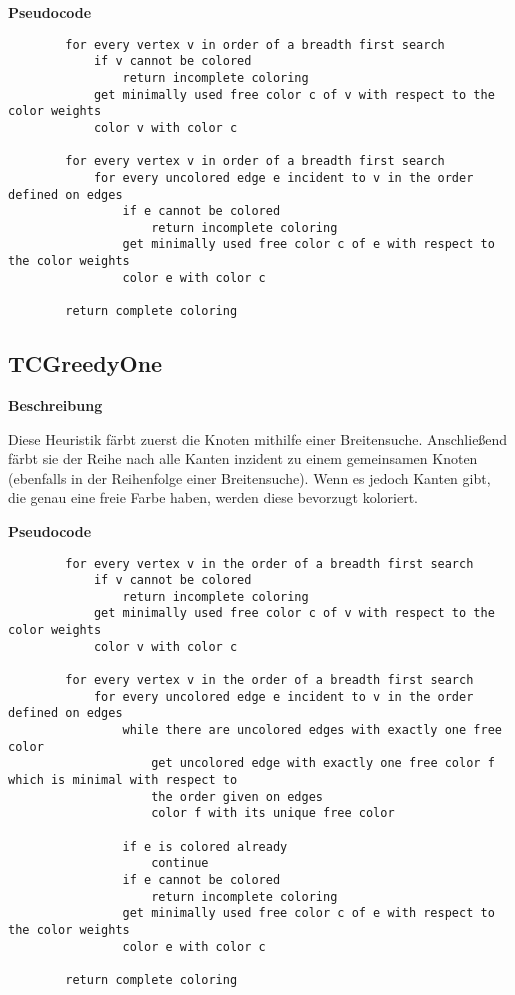 \documentclass{article}
\begin{document}
	\textbf{Pseudocode}
	\begin{verbatim}
		for every vertex v in order of a breadth first search
		    if v cannot be colored
		        return incomplete coloring
		    get minimally used free color c of v with respect to the color weights
		    color v with color c
				    
		for every vertex v in order of a breadth first search
		    for every uncolored edge e incident to v in the order defined on edges
		        if e cannot be colored
		            return incomplete coloring
		        get minimally used free color c of e with respect to the color weights
		        color e with color c
				        
		return complete coloring
	\end{verbatim}
	
	\subsection{TCGreedyOne}
	
	\textbf{Beschreibung}
	
	Diese Heuristik färbt zuerst die Knoten mithilfe einer Breitensuche. Anschließend färbt sie der Reihe nach alle Kanten inzident zu einem gemeinsamen Knoten  (ebenfalls in der Reihenfolge einer Breitensuche). Wenn es jedoch Kanten gibt, die genau eine freie Farbe haben, werden diese bevorzugt koloriert.
	
	\textbf{Pseudocode}
	\begin{verbatim}
		for every vertex v in the order of a breadth first search
		    if v cannot be colored
		        return incomplete coloring
		    get minimally used free color c of v with respect to the color weights
		    color v with color c
				    
		for every vertex v in the order of a breadth first search
		    for every uncolored edge e incident to v in the order defined on edges
		        while there are uncolored edges with exactly one free color
		            get uncolored edge with exactly one free color f which is minimal with respect to 
		            the order given on edges
		            color f with its unique free color
		            
		        if e is colored already
		            continue
		        if e cannot be colored
		            return incomplete coloring
		        get minimally used free color c of e with respect to the color weights
		        color e with color c
				        
		return complete coloring
	\end{verbatim}
		
\end{document}
